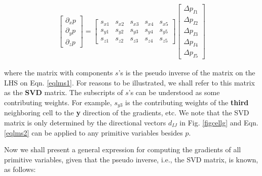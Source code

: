 \documentclass[12pt, letterpaper]{report}
\begin{document}
\begin{align}\label{eqlms2}
   \begin{bmatrix}\partial_x p \\ \partial_y p \\ \partial_z p\end{bmatrix} = 
   \begin{bmatrix}
      s_{x1} &s_{x2} &s_{x3} &s_{x4} &s_{x5} \\ 
      s_{y1} &s_{y2} &s_{y3} &s_{y4} &s_{y5} \\ 
      s_{z1} &s_{z2} &s_{z3} &s_{z4} &s_{z5}
   \end{bmatrix}
   \begin{bmatrix}\Delta p_{I1} \\\Delta p_{I2} \\\Delta p_{I3} \\\Delta p_{I4} \\\Delta p_{I5}\end{bmatrix}
\end{align}

where the matrix with components $s$'s is the pseudo inverse of the matrix on the LHS on Eqn.
\ref{eqlms1}. For reasons to be illustrated, we shall refer to this matrix as the {\bf SVD} matrix.
The subscripts of $s$'s can be understood as some contributing weights. For example, $s_{y3}$ is the
contributing weights of the {\bf third} neighboring cell to the {\bf y} direction of the gradients,
etc. We note that the SVD matrix is only determined by the directional vectors $d_{IJ}$ in Fig.
\ref{figcellg} and Eqn. \ref{eqlms2} can be applied to any primitive variables besides $p$.
\paraspace

Now we shall present a general expression for computing the gradients of all primitive variables,
given that the pseudo inverse, i.e., the SVD matrix, is known, as follows:
\end{document}
